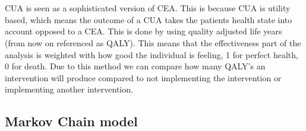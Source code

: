 \documentclass[a4paper,12pt]{article}
\begin{document}
\\\\
CUA is seen as a sophisticated version of CEA. This is because CUA is utility based, which means the outcome of a CUA takes the patients health state into account opposed to a CEA. This is done by using quality adjusted life years (from now on referenced as QALY). This means that the effectiveness part of the analysis is weighted with how good the individual is feeling, 1 for perfect health, 0 for death. Due to this method we can compare how many QALY’s an intervention will produce compared to not implementing the intervention or implementing another intervention. 



\subsection{Markov Chain model}
\end{document}
